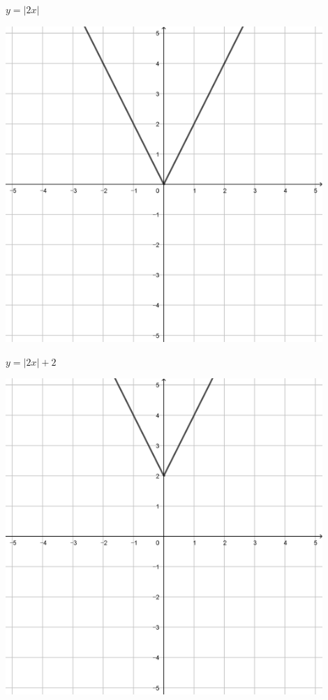 \documentclass[a4paper]{oblivoir}
\begin{document}
\begin{minipage}{0.45\textwidth}\centering
\(y=|2x|\)
\par\bigskip\includegraphics[width=0.9\textwidth]{img/15-5}
\end{minipage}
\begin{minipage}{0.45\textwidth}\centering
\(y=|2x|+2\)
\par\bigskip\includegraphics[width=0.9\textwidth]{img/15-6}
\end{minipage}\bigskip\bigskip\par
\end{document}
